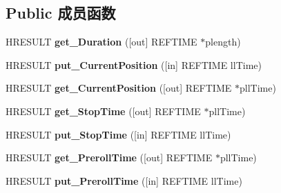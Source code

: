 \subsection*{Public 成员函数}
\begin{DoxyCompactItemize}
\item 
\mbox{\label{interface_quartz_type_lib_1_1_i_media_position_a650c1e0dc1d664d1216f9cb6787eb623}} 
H\+R\+E\+S\+U\+LT {\bfseries get\+\_\+\+Duration} (\mbox{[}out\mbox{]} R\+E\+F\+T\+I\+ME $\ast$plength)
\item 
\mbox{\label{interface_quartz_type_lib_1_1_i_media_position_af91042eddd28e981387f313e7ab07dc3}} 
H\+R\+E\+S\+U\+LT {\bfseries put\+\_\+\+Current\+Position} (\mbox{[}in\mbox{]} R\+E\+F\+T\+I\+ME ll\+Time)
\item 
\mbox{\label{interface_quartz_type_lib_1_1_i_media_position_a50cf7b5d27dc4b44a1e33db53bcd7d85}} 
H\+R\+E\+S\+U\+LT {\bfseries get\+\_\+\+Current\+Position} (\mbox{[}out\mbox{]} R\+E\+F\+T\+I\+ME $\ast$pll\+Time)
\item 
\mbox{\label{interface_quartz_type_lib_1_1_i_media_position_af57ad2db130d98f5c8e996d75546a2c4}} 
H\+R\+E\+S\+U\+LT {\bfseries get\+\_\+\+Stop\+Time} (\mbox{[}out\mbox{]} R\+E\+F\+T\+I\+ME $\ast$pll\+Time)
\item 
\mbox{\label{interface_quartz_type_lib_1_1_i_media_position_a0a47fc3d8014e343c2b60c192baf2049}} 
H\+R\+E\+S\+U\+LT {\bfseries put\+\_\+\+Stop\+Time} (\mbox{[}in\mbox{]} R\+E\+F\+T\+I\+ME ll\+Time)
\item 
\mbox{\label{interface_quartz_type_lib_1_1_i_media_position_af51e137fe29375bebad87aa510e39edc}} 
H\+R\+E\+S\+U\+LT {\bfseries get\+\_\+\+Preroll\+Time} (\mbox{[}out\mbox{]} R\+E\+F\+T\+I\+ME $\ast$pll\+Time)
\item 
\mbox{\label{interface_quartz_type_lib_1_1_i_media_position_ae4ed0020b310d7fe383db08fb6490393}} 
H\+R\+E\+S\+U\+LT {\bfseries put\+\_\+\+Preroll\+Time} (\mbox{[}in\mbox{]} R\+E\+F\+T\+I\+ME ll\+Time)

\end{DoxyCompactItemize}
